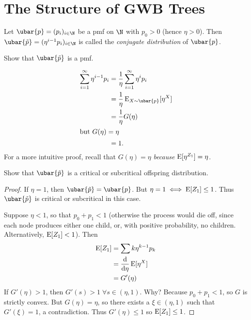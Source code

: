 \section{The Structure of GWB Trees}
\begin{definition} \label{def:conjugate}
    Let $\ubar{p} = (p_i)_{i \in \N}$ be a pmf on $\N$ with $p_0 > 0$
    (hence $\eta > 0$).
    Then $\ubar{\tilde{p}} = (\eta^{i-1} p_i)_{i \in \N}$ is called the
    \emph{conjugate distribution} of $\ubar{p}$.
\end{definition}

\begin{exercise}
    Show that $\ubar{\tilde{p}}$ is a pmf.
\end{exercise}
\begin{solution}
    \begin{align*}
        \sum_{i=1}^\infty \eta^{i-1} p_i
            &= \frac1{\eta} \sum_{i=1}^\infty \eta^i p_i \\
            &= \frac1{\eta} \E_{X \sim \ubar{p}}[\eta^X] \\
            &= \frac1{\eta} G(\eta) \\
        \intertext{but $G(\eta) = \eta$}
            &= 1.
    \end{align*}
    For a more intuitive proof, recall that $G(\eta) = \eta$ \emph{because}
    $\operatorname{\mathrm{E}}[\eta^{Z_1}] = \eta$.
\end{solution}

\begin{exercise}
    Show that $\ubar{\tilde{p}}$ is a critical or subcritical offspring
    distribution.
\end{exercise}
\begin{proof}
    If $\eta = 1$, then $\ubar{\tilde{p}} = \ubar{p}$.
    But $\eta = 1 \iff \operatorname{\mathrm{E}}[Z_1] \le 1$.
    Thus $\ubar{\tilde{p}}$ is critical or subcritical in this case.

    Suppose $\eta < 1$, so that $p_0 + p_1 < 1$
    (otherwise the process would die off, since each node produces either
    one child, or, with positive probability, no children.
    Alternatively, $\operatorname{\mathrm{E}}[Z_1] < 1$).
    Then \begin{align*}
        \operatorname{\mathrm{E}}[Z_1] &= \sum k \eta^{k-1} p_k \\
                &= \dv{}{\eta} \operatorname{\mathrm{E}}[\eta^X] \\
                &= G'(\eta)
    \end{align*}
    If $G'(\eta) > 1$, then $G'(s) > 1 \;\forall s \in (\eta, 1)$.
    Why? Because $p_0 + p_1 < 1$, so $G$ is strictly convex.
    But $G(\eta) = \eta$, so there exists a $\xi \in (\eta, 1)$ such that
    $G'(\xi) = 1$, a contradiction.
    Thus $G'(\eta) \le 1$ so $\operatorname{\mathrm{E}}[Z_1] \le 1$.
\end{proof}

